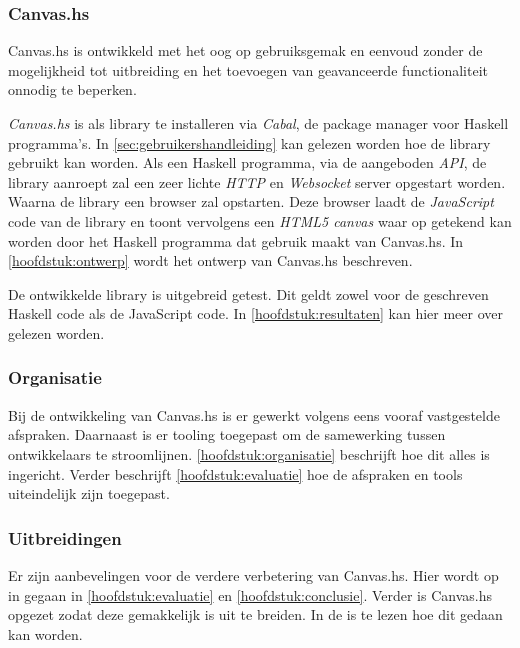 \subsubsection{Canvas.hs}
Canvas.hs is ontwikkeld met het oog op gebruiksgemak en eenvoud zonder de mogelijkheid tot uitbreiding en het toevoegen van geavanceerde functionaliteit onnodig te beperken.

\emph{Canvas.hs} is als library te installeren via \emph{Cabal}, de package manager voor Haskell programma's. In \autoref{sec:gebruikershandleiding} kan gelezen worden hoe de library gebruikt kan worden. Als een Haskell programma, via de aangeboden \emph{API}, de library aanroept zal een zeer lichte \emph{HTTP} en \emph{Websocket} server opgestart worden. Waarna de library een browser zal opstarten. Deze browser laadt de \emph{JavaScript} code van de library en toont vervolgens een \emph{HTML5 canvas} waar op getekend kan worden door het Haskell programma dat gebruik maakt van Canvas.hs. In \autoref{hoofdstuk:ontwerp} wordt het ontwerp van Canvas.hs beschreven.

De ontwikkelde library is uitgebreid getest. Dit geldt zowel voor de geschreven Haskell code als de JavaScript code. In \autoref{hoofdstuk:resultaten} kan hier meer over gelezen worden.

\subsubsection{Organisatie}
Bij de ontwikkeling van Canvas.hs is er gewerkt volgens eens vooraf vastgestelde afspraken. Daarnaast is er tooling toegepast om de samewerking tussen ontwikkelaars te stroomlijnen. \autoref{hoofdstuk:organisatie} beschrijft hoe dit alles is ingericht. Verder beschrijft \autoref{hoofdstuk:evaluatie}  hoe de afspraken en tools uiteindelijk zijn toegepast.

\subsubsection{Uitbreidingen}
Er zijn aanbevelingen voor de verdere verbetering van Canvas.hs. Hier wordt op in gegaan in \autoref{hoofdstuk:evaluatie} en \autoref{hoofdstuk:conclusie}. Verder is Canvas.hs opgezet zodat deze gemakkelijk is uit te breiden. In de  is te lezen hoe dit gedaan kan worden.




